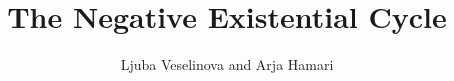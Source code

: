 \title{The Negative Existential Cycle}
\subtitle{}%
\author{Ljuba Veselinova and Arja Hamari}
\renewcommand{\lsSeries}{rcg}%
\renewcommand{\lsSeriesNumber}{1}
